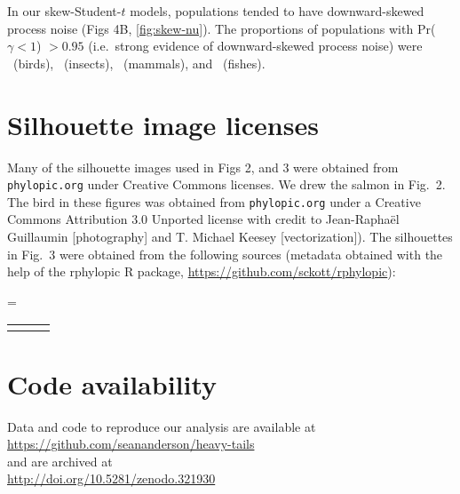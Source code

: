 \documentclass[12pt]{article}
\begin{document}
In our skew-Student-$t$ models, populations tended to have downward-skewed
process noise (Figs 4B, \ref{fig:skew-nu}). The proportions of populations with
Pr($\gamma < 1$) $> 0.95$
(i.e.\ strong evidence of downward-skewed process noise)
were
\propSkewedAves\ (birds), \propSkewedInsecta\ (insects),
\propSkewedMammalia\ (mammals), and \propSkewedOsteichthyes\ (fishes).

\section{Silhouette image licenses}

Many of the silhouette images used in Figs 2, and 3 were obtained from
\texttt{phylopic.org} under Creative Commons licenses. We drew the
salmon in Fig.~2. The bird in these figures was obtained
from \texttt{phylopic.org} under a Creative Commons Attribution 3.0 Unported
license with credit to Jean-Raphaël Guillaumin {[}photography{]} and T.
Michael Keesey {[}vectorization{]}). The silhouettes in
Fig.~3 were obtained from the following sources (metadata
obtained with the help of the rphylopic R package,
\url{https://github.com/sckott/rphylopic}):

\clearpage

\LTcapwidth=\textwidth
\singlespacing
\begin{footnotesize}
\begin{longtable}{>{\RaggedRight}m{3.2cm}>{\RaggedRight}p{6.5cm}>{\RaggedRight}p{5.0cm}}
\toprule

\label{tab:phylopic}
\end{longtable}
\end{footnotesize}
\onehalfspacing

\section{Code availability} Data and code to reproduce our analysis are
available at\\ \url{https://github.com/seananderson/heavy-tails}\\ and are archived at\\ \url{http://doi.org/10.5281/zenodo.321930}

%



\clearpage
\end{document}
